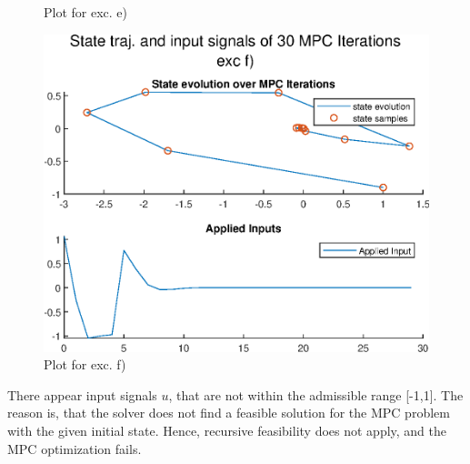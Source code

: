 \documentclass[]{article}
\begin{document}
\begin{enumerate}
{\begin{figure}[H]
					\caption[Plot for exc. e)]{Plot for exc. e)}
					\label{fig:exce}
				\end{figure}}
		{	\item[f)]
			\begin{figure}[H]
				\centering
				\includegraphics[width=0.9\linewidth]{plots/exc_f}
				\caption[Plot for exc. f)]{Plot for exc. f)}
				\label{fig:excf}
			\end{figure}
			There appear input signals $ u $, that are not within the admissible range [-1,1]. The reason is, that the solver does not find a feasible solution for the MPC problem with the given initial state. Hence, recursive feasibility does not apply, and the MPC optimization fails.
		}
		
					
		\end{enumerate}	
		
\end{document}
